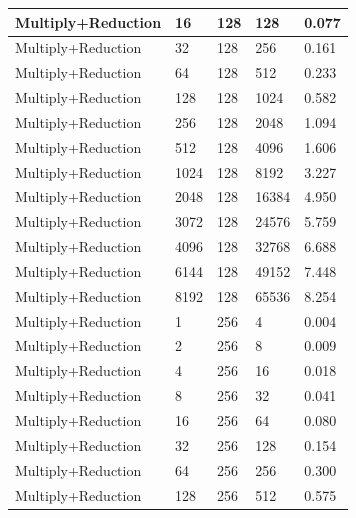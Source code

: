 \documentclass{article}
\begin{document}
\begin{longtable}{|l|l|l|l|l|}
Multiply+Reduction & 16   & 128         & 128               & 0.077             \\ \hline
Multiply+Reduction & 32   & 128         & 256               & 0.161             \\ \hline
Multiply+Reduction & 64   & 128         & 512               & 0.233             \\ \hline
Multiply+Reduction & 128  & 128         & 1024              & 0.582             \\ \hline
Multiply+Reduction & 256  & 128         & 2048              & 1.094             \\ \hline
Multiply+Reduction & 512  & 128         & 4096              & 1.606             \\ \hline
Multiply+Reduction & 1024 & 128         & 8192              & 3.227             \\ \hline
Multiply+Reduction & 2048 & 128         & 16384             & 4.950             \\ \hline
Multiply+Reduction & 3072 & 128         & 24576             & 5.759             \\ \hline
Multiply+Reduction & 4096 & 128         & 32768             & 6.688             \\ \hline
Multiply+Reduction & 6144 & 128         & 49152             & 7.448             \\ \hline
Multiply+Reduction & 8192 & 128         & 65536             & 8.254             \\ \hline
Multiply+Reduction & 1    & 256         & 4                 & 0.004             \\ \hline
Multiply+Reduction & 2    & 256         & 8                 & 0.009             \\ \hline
Multiply+Reduction & 4    & 256         & 16                & 0.018             \\ \hline
Multiply+Reduction & 8    & 256         & 32                & 0.041             \\ \hline
Multiply+Reduction & 16   & 256         & 64                & 0.080             \\ \hline
Multiply+Reduction & 32   & 256         & 128               & 0.154             \\ \hline
Multiply+Reduction & 64   & 256         & 256               & 0.300             \\ \hline
Multiply+Reduction & 128  & 256         & 512               & 0.575             \\ \hline

\end{longtable}
\end{document}
